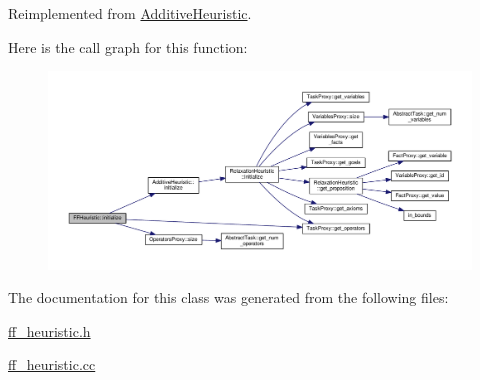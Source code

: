 Reimplemented from \hyperlink{classAdditiveHeuristic_a4c952cd832e8dd3ea364d8cac379ebbc}{Additive\-Heuristic}.



Here is the call graph for this function\-:
\nopagebreak
\begin{figure}[H]
\begin{center}
\leavevmode
\includegraphics[width=350pt]{classFFHeuristic_ad17e4f428e5c4fc89d4e0de8e8ed6d80_cgraph}
\end{center}
\end{figure}




The documentation for this class was generated from the following files\-:\begin{DoxyCompactItemize}
\item 
\hyperlink{ff__heuristic_8h}{ff\-\_\-heuristic.\-h}\item 
\hyperlink{ff__heuristic_8cc}{ff\-\_\-heuristic.\-cc}\end{DoxyCompactItemize}
